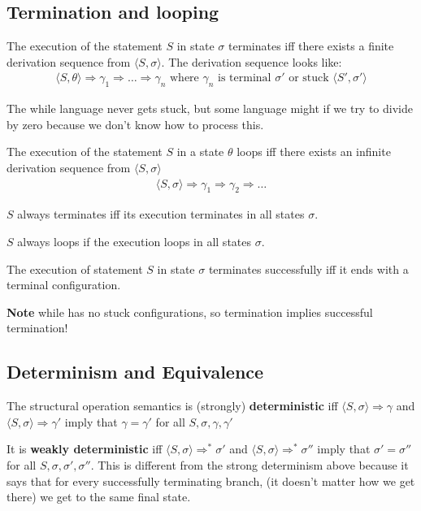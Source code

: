 \documentclass[11pt,a4paper,titlepage,dvipsnames,cmyk]{scrartcl}
\begin{document}
\subsection{Termination and looping}%
\label{sub:term-loop}

The execution of the statement $S$ in state $\sigma$ terminates iff there
exists a finite derivation sequence from $\langle S, \sigma \rangle$. The
derivation sequence looks like:
\begin{align*}
    \langle S, \theta\rangle \Rightarrow \gamma_1 \Rightarrow \dots
    \Rightarrow \gamma_n \text{ where } \gamma_n \text{ is terminal }
    \sigma' \text{ or stuck } \langle S', \sigma'\rangle
\end{align*}

The while language never gets stuck, but some language might if we try to
divide by zero because we don't know how to process this.

The execution of the statement $S$ in a state $\theta$ loops iff there
exists an infinite derivation sequence from $\langle S, \sigma \rangle$
\begin{align*}
    \langle S, \sigma \rangle \Rightarrow \gamma_1 \Rightarrow \gamma_2
    \Rightarrow \dots
\end{align*}

$S$ always terminates iff its execution terminates in all states $\sigma$.

$S$ always loops if the execution loops in all states $\sigma$.

The execution of statement $S$ in state $\sigma$ terminates successfully
iff it ends with a terminal configuration.

\textbf{Note} while has no stuck configurations, so termination implies
successful termination!

\subsection{Determinism and Equivalence}%
\label{sub:determinism}
The structural operation semantics is (strongly) \textbf{deterministic}
iff $\langle S, \sigma \rangle \Rightarrow \gamma$ and $\langle S, \sigma
\rangle \Rightarrow \gamma'$ imply that $\gamma = \gamma'$ for all $S,
\sigma, \gamma, \gamma'$

It is \textbf{weakly deterministic} iff $\langle S, \sigma \rangle
\Rightarrow^* \sigma'$ and $\langle S, \sigma \rangle \Rightarrow^*
\sigma''$ imply that $\sigma' = \sigma''$ for all $S, \sigma, \sigma',
\sigma''$. This is different from the strong determinism above because it
says that for every successfully terminating branch, (it doesn't matter
how we get there) we get to the same final state.
\end{document}
